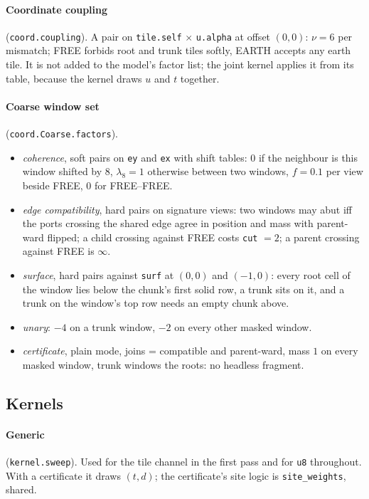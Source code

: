 \documentclass[11pt]{article}
\newcommand{\1}{\mathds{1}}
\newcommand{\code}[1]{\texttt{#1}}
\begin{document}
\paragraph{Coordinate coupling} (\code{coord.coupling}). A pair on
\code{tile.self} $\times$ \code{u.alpha} at offset $(0, 0)$: $\nu = 6$ per
mismatch; FREE forbids root and trunk tiles softly, EARTH accepts any
earth tile. It is not added to the model's factor list; the joint kernel
applies it from its table, because the kernel draws $u$ and $t$ together.

\paragraph{Coarse window set} (\code{coord.Coarse.factors}).
\begin{itemize}
\item \emph{coherence}, soft pairs on \code{ey} and \code{ex} with shift
  tables: $0$ if the neighbour is this window shifted by 8, $\lambda_8 = 1$
  otherwise between two windows, $f = 0.1$ per view beside FREE,
  $0$ for FREE--FREE.
\item \emph{edge compatibility}, hard pairs on signature views: two windows
  may abut iff the ports crossing the shared edge agree in position and
  mass with parent-ward flipped; a child crossing against FREE costs
  \code{cut} $= 2$; a parent crossing against FREE is $\infty$.
\item \emph{surface}, hard pairs against \code{surf} at $(0,0)$ and
  $(-1,0)$: every root cell of the window lies below the chunk's first
  solid row, a trunk sits on it, and a trunk on the window's top row needs
  an empty chunk above.
\item \emph{unary}: $-4$ on a trunk window, $-2$ on every other masked
  window.
\item \emph{certificate}, plain mode, joins = compatible and parent-ward,
  mass $1$ on every masked window, trunk windows the roots: no headless
  fragment.
\end{itemize}

\subsection{Kernels}

\paragraph{Generic} (\code{kernel.sweep}). Used for the tile channel in the
first pass and for \code{u8} throughout. With a certificate it draws
$(t, d)$; the certificate's site logic is \code{site\_weights}, shared.
\end{document}
